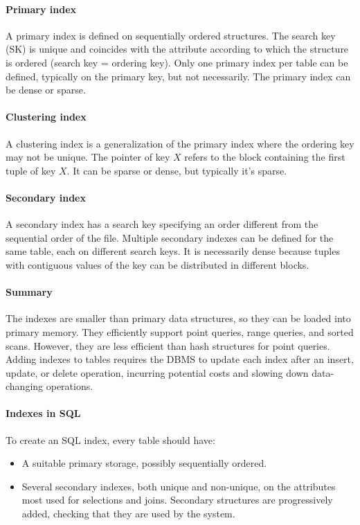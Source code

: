 \paragraph*{Primary index}
A primary index is defined on sequentially ordered structures.
The search key (SK) is unique and coincides with the attribute according to which the structure is ordered (search key = ordering key). 
Only one primary index per table can be defined, typically on the primary key, but not necessarily. 
The primary index can be dense or sparse.

\paragraph*{Clustering index}
A clustering index is a generalization of the primary index where the ordering key may not be unique.
The pointer of key $X$ refers to the block containing the first tuple of key $X$.
It can be sparse or dense, but typically it's sparse.

\paragraph*{Secondary index}
A secondary index has a search key specifying an order different from the sequential order of the file.
Multiple secondary indexes can be defined for the same table, each on different search keys.
It is necessarily dense because tuples with contiguous values of the key can be distributed in different blocks.

\paragraph*{Summary} 
The indexes are smaller than primary data structures, so they can be loaded into primary memory. 
They efficiently support point queries, range queries, and sorted scans. 
However, they are less efficient than hash structures for point queries. 
Adding indexes to tables requires the DBMS to update each index after an insert, update, or delete operation, incurring potential costs and slowing down data-changing operations.

\paragraph*{Indexes in SQL}
To create an SQL index, every table should have:
\begin{itemize}
  \item A suitable primary storage, possibly sequentially ordered.
  \item Several secondary indexes, both unique and non-unique, on the attributes most used for selections and joins.
    Secondary structures are progressively added, checking that they are used by the system.
\end{itemize}

